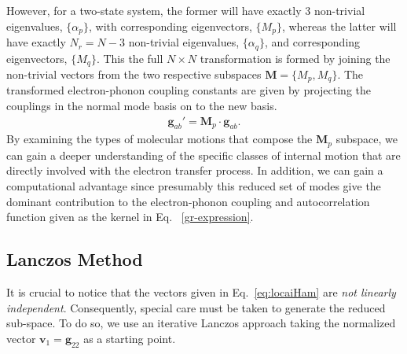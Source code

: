 However, for a two-state system, the former will have exactly $3$ non-trivial eigenvalues, $\{\alpha_{p}\}$, with corresponding
eigenvectors, $\{ M_{p}\}$, whereas the latter will have exactly $N_{r} = N-3$ non-trivial eigenvalues, $\{\alpha_{q}\}$,  and corresponding
eigenvectors, $\{M_q\}$.   This the full $N\times N$ transformation is formed by joining the non-trivial vectors from the
two respective subspaces ${\mathbf M} = \{M_{p}, M_{q}\}$.
The transformed electron-phonon coupling constants are given by projecting the  couplings   in the normal mode basis on to the new
basis.
\begin{eqnarray}
\mathbf{g}_{ab}'=\mathbf{M}_{p}\cdot\mathbf{g}_{ab}.
\end{eqnarray}
By examining the types of molecular motions that compose the ${\mathbf M_{p}}$ subspace, we can
gain a deeper understanding of the specific classes of internal motion that are directly involved with the
electron transfer process.  In addition,  we can gain a computational advantage since presumably this
 reduced set of modes give the dominant contribution to the electron-phonon coupling and  autocorrelation
 function given as the kernel in Eq. ~\ref{gr-expression}.

\subsection{Lanczos Method}
It is crucial to notice that the vectors  given in Eq.~\ref{eq:locaiHam} are {\em not linearly independent}.
 Consequently, special care
must be taken to generate the reduced sub-space.  To do so, we use an iterative Lanczos approach
taking the normalized vector ${\mathbf v}_{1} = {\mathbf g}_{22}$ as a starting point.


